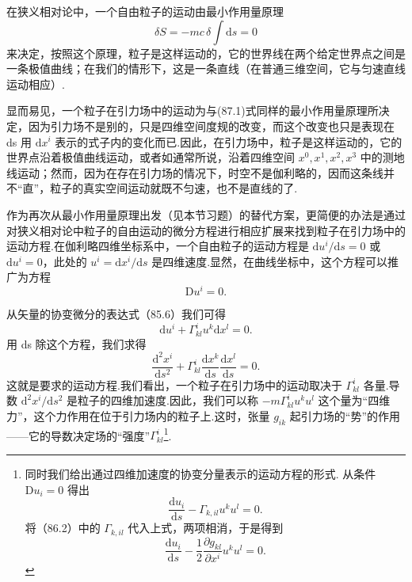 在狭义相对论中，一个自由粒子的运动由最小作用量原理
\begin{equation}
  \delta S=-mc\,\delta\int\mathrm{d}s=0
\end{equation}
来决定，按照这个原理，粒子是这样运动的，它的世界线在两个给定世界点之间是一条极值曲线；在我们的情形下，这是一条直线（在普通三维空间，它与匀速直线运动相应）.

显而易见，一个粒子在引力场中的运动为与(87.1)式同样的最小作用量原理所决定，因为引力场不是别的，只是四维空间度规的改变，而这个改变也只是表现在 ds 用 $\mathrm{d}x^i$ 表示的式子内的变化而已.因此，在引力场中，粒子是这样运动的，它的世界点沿着极值曲线运动，或者如通常所说，沿着四维空间 $x^0,x^1,x^2,x^3$ 中的测地线运动；然而，因为在存在引力场的情况下，时空不是伽利略的，因而这条线并不“直”，粒子的真实空间运动就既不匀速，也不是直线的了.

作为再次从最小作用量原理出发（见本节习题）的替代方案，更简便的办法是通过对狭义相对论中粒子的自由运动的微分方程进行相应扩展来找到粒子在引力场中的运动方程.在伽利略四维坐标系中，一个自由粒子的运动方程是 $\mathrm{d}u^i/\mathrm{d}s=0$ 或 $\mathrm{d}u^i=0$，此处的 $u^i=\mathrm{d}x^i/\mathrm{d}s$ 是四维速度.显然，在曲线坐标中，这个方程可以推广为方程
\begin{equation}
  \mathrm{D}u^i=0.
\end{equation}

从矢量的协变微分的表达式（85.6）我们可得
\begin{equation*}
  \mathrm{d}u^i+\Gamma^i_{kl}u^k\mathrm{d}x^l=0.
\end{equation*}
用 ds 除这个方程，我们求得
\begin{equation}
  \frac{\mathrm{d}^2x^i}{\mathrm{d}s^2}
  +\Gamma^i_{kl}\frac{\mathrm{d}x^k}{\mathrm{d}s}
  \frac{\mathrm{d}x^l}{\mathrm{d}s}=0.
\end{equation}
这就是要求的运动方程.我们看出，一个粒子在引力场中的运动取决于 $\Gamma^i_{kl}$ 各量.导数 $\mathrm{d}^2x^i/\mathrm{d}s^2$ 是粒子的四维加速度.因此，我们可以称 $-m\Gamma^i_{kl}u^ku^l$ 这个量为“四维力”，这个力作用在位于引力场内的粒子上.这时，张量 $g_{ik}$ 起引力场的“势”的作用——它的导数决定场的“强度”$\Gamma^i_{kl}$\footnote{同时我们给出通过四维加速度的协变分量表示的运动方程的形式. 从条件 $\mathrm{D}u_i=0$ 得出
\begin{equation*}
  \frac{\mathrm{d}u_i}{\mathrm{d}s}-\Gamma_{k,il}u^ku^l=0.
\end{equation*}
将（86.2）中的 $\Gamma_{k,il}$ 代入上式，两项相消，于是得到
\begin{equation*}\tag{87.3a}
  \frac{\mathrm{d}u_i}{\mathrm{d}s}
  -\frac{1}{2}\frac{\partial g_{kl}}{\partial x^i}u^ku^l=0.
\end{equation*}}.

